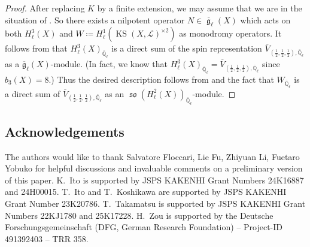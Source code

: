 \documentclass[12pt,reqno]{amsart}
\theoremstyle{definition}
\newcommand{\Q}{{\mathds Q}}
\renewcommand\ge{\mathop{\mathfrak{g}}\nolimits}
\newcommand\so{\mathop{\mathfrak{so}}\nolimits}
\newcommand\KS{\mathop{\mathrm{KS}}\nolimits}
\newcommand{\rfrg}{\overline{\mathfrak{g}}}
\newcommand{\scrL}{\mathscr{L}}
\numberwithin{equation}{section}
\begin{document}
\begin{proof}
    After replacing $K$ by a finite extension, we may assume that we are in the situation of .
    So there exists a nilpotent operator
    $N \in \overline{\ge}_\ell(X)$
    which acts on both $H^3_\ell(X)$ and $W\coloneqq H^1_\ell(\KS(X, \scrL)^{\times 2})$ as monodromy operators.
    It follows from \cite[Lemma 3.11]{Soldatenkov20a}
    that 
    $H^3_\ell(X)_{\overline{\Q}_\ell}$
    is a direct sum of the spin representation
    $\overline{V}_{(\frac{1}{2}, \frac{1}{2}, \frac{1}{2}), \overline{\Q}_\ell}$ as a $\rfrg_{\ell}(X)$-module.
    (In fact, we know that $H^3_\ell(X)_{\overline{\Q}_\ell}=\overline{V}_{(\frac{1}{2}, \frac{1}{2}, \frac{1}{2}), \overline{\Q}_\ell}$ since $b_3(X) =8$.)
    Thus the desired description follows from 
    and
    the fact that
    $W_{\overline{\Q}_\ell}$
    is a direct sum of $\overline{V}_{(\frac{1}{2}, \frac{1}{2}, \frac{1}{2}), \overline{\Q}_\ell}$
    as an $\so(H^2_\ell(X))_{\overline{\Q}_\ell}$-module.
\end{proof}







\subsection*{Acknowledgements}
The authors would like to thank Salvatore Floccari, Lie Fu, Zhiyuan Li, Fuetaro Yobuko for helpful discussions and invaluable comments on a preliminary version of this paper.
K.~Ito is supported by JSPS KAKENHI Grant Numbers 24K16887 and 24H00015.
T.~Ito and T.~Koshikawa are supported by JSPS KAKENHI Grant Number 23K20786. 
T.~Takamatsu is supported by JSPS KAKENHI Grant Numbers 22KJ1780 and 25K17228.
H.~Zou is supported by the Deutsche Forschungsgemeinschaft (DFG, German Research Foundation) – Project-ID 491392403 – TRR 358.


\printbibliography
\end{document}
